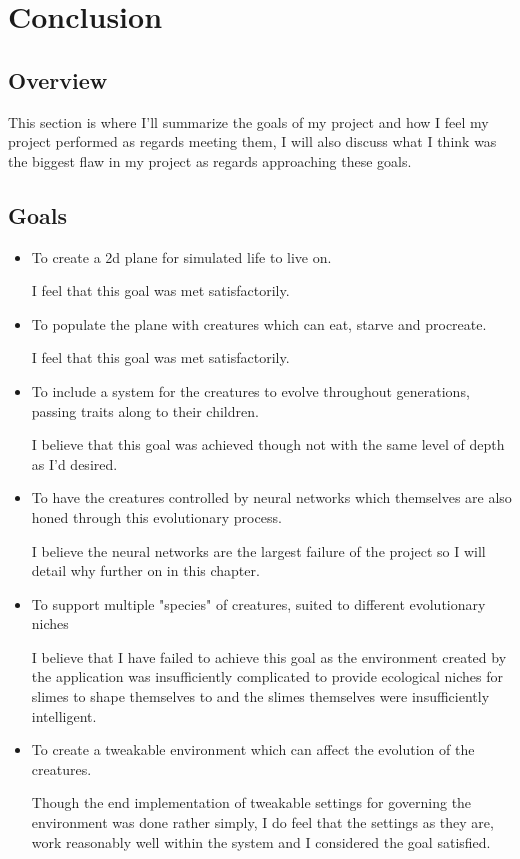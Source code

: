 \chapter{Conclusion}
\section{Overview}
This section is where I'll summarize the goals of my project and how I feel my project performed as regards meeting them, I will also discuss what I think was the biggest flaw in my project as regards approaching these goals.
\section{Goals}
\begin{itemize}
    \item To create a 2d plane for simulated life to live on.
    \par
    I feel that this goal was met satisfactorily.
    \item To populate the plane with creatures which can eat, starve and procreate.
    \par
    I feel that this goal was met satisfactorily.
    \item To include a system for the creatures to evolve throughout generations, passing traits along to their children.
    \par
    I believe that this goal was achieved though not with the same level of depth as I'd desired.
    \item To have the creatures controlled by neural networks which themselves are also honed through this evolutionary process.
    \par
    I believe the neural networks are the largest failure of the project so I will detail why further on in this chapter.
    \item To support multiple "species" of creatures, suited to different evolutionary niches
    \par
    I believe that I have failed to achieve this goal as the environment created by the application was insufficiently complicated to provide ecological niches for slimes to shape themselves to and the slimes themselves were insufficiently intelligent.
    \item To create a tweakable environment which can affect the evolution of the creatures.
    \par
    Though the end implementation of tweakable settings for governing the environment was done rather simply, I do feel that the settings as they are, work reasonably well within the system and I considered the goal satisfied.
\end{itemize}
